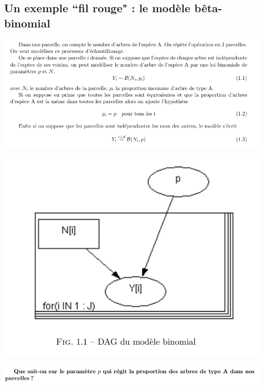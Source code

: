 \subsection{Un exemple ``fil rouge" : le modèle bêta-binomial}

\includegraphics[scale=0.5]{figures/openbugsjags/betabin1.png} \\

\begin{center}
\includegraphics[scale=0.5]{figures/openbugsjags/beta-bin2.png} \\
\end{center}

\includegraphics[scale=0.5]{figures/openbugsjags/beta-bin3.png} \\

